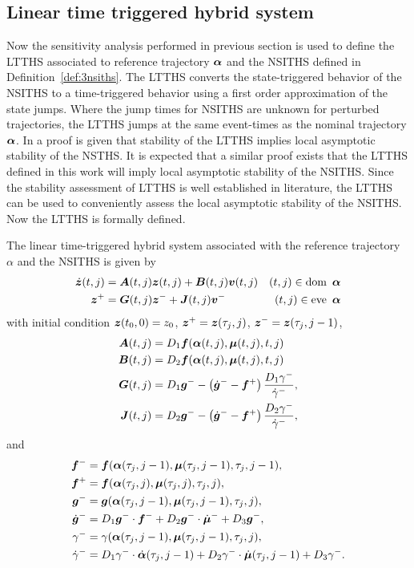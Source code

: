 \documentclass[../DC2017114Bouma.tex]{subfiles}
\begin{document}
\subsection{Linear time triggered hybrid system}
Now the sensitivity analysis performed in previous section is used to define the LTTHS associated to reference trajectory $\boldsymbol{\alpha}$ and the NSITHS defined in Definition~\ref{def:3nsiths}. The LTTHS converts the state-triggered behavior of the NSITHS to a time-triggered behavior using a first order approximation of the state jumps. Where the jump times for NSITHS are unknown for perturbed trajectories, the LTTHS jumps at the same event-times as the nominal trajectory $\boldsymbol{\alpha}$. In \cite{Rijnen2017} a proof is given that stability of the LTTHS implies local asymptotic stability of the NSTHS. It is expected that a similar proof exists that the LTTHS defined in this work will imply local asymptotic stability of the NSITHS. Since the stability assessment of LTTHS is well established in literature, the LTTHS can be used to conveniently assess the local asymptotic stability of the NSITHS. Now the LTTHS is formally defined.
\begin{mydef}[LTTHS]\label{def:3ltths}
The linear time-triggered hybrid system associated with the reference trajectory $\alpha$ and the NSITHS is given by
\begin{align}
\dot{{\boldsymbol{z}}}(t,j) &= {\boldsymbol{A}}(t,j){\boldsymbol{z}}(t,j) + {\boldsymbol{B}}(t,j){\boldsymbol{v}}(t,j) &(t,j)\in \operatorname{\textnormal{dom}}\ \boldsymbol{\alpha}\\
{\boldsymbol{z}}^+ &= {\boldsymbol{G}}(t,j){\boldsymbol{z}}^- + {\boldsymbol{J}}(t,j){\boldsymbol{v}}^- &(t,j)\in \operatorname{\textnormal{eve}}\ \boldsymbol{\alpha}
\end{align}
with initial condition ${\boldsymbol{z}}(t_0,0)=z_0$, ${\boldsymbol{z}}^+ = {\boldsymbol{z}}(\tau_j,j)$, ${\boldsymbol{z}}^- = {\boldsymbol{z}}(\tau_j,j-1)$,
\begin{align}
{\boldsymbol{A}}(t,j) &= D_1{\boldsymbol{f}}(\boldsymbol{\alpha}(t,j),\boldsymbol{\mu}(t,j),t,j)\\
{\boldsymbol{B}}(t,j) &= D_2{\boldsymbol{f}}(\boldsymbol{\alpha}(t,j),\boldsymbol{\mu}(t,j),t,j)\\
{\boldsymbol{G}}(t,j) & = D_1{\boldsymbol{g}}^- - \left(\dot{{\boldsymbol{g}}}^- - {\boldsymbol{f}}^+\right)\frac{D_1\gamma^-}{\dot{\gamma}^-},\\
{\boldsymbol{J}}(t,j) & = D_2{\boldsymbol{g}}^- - \left(\dot{{\boldsymbol{g}}}^- - {\boldsymbol{f}}^+\right)\frac{D_2\gamma^-}{\dot{\gamma}^-},
\end{align}
and
\begin{align}
{\boldsymbol{f}}^- &= {\boldsymbol{f}}(\boldsymbol{\alpha}(\tau_j,j-1),\boldsymbol{\mu}(\tau_j,j-1),\tau_j,j-1),\\
{\boldsymbol{f}}^+ &= {\boldsymbol{f}}(\boldsymbol{\alpha}(\tau_j,j),\boldsymbol{\mu}(\tau_j,j),\tau_j,j),\\
{\boldsymbol{g}}^- &= {\boldsymbol{g}}(\boldsymbol{\alpha}(\tau_j,j-1),\boldsymbol{\mu}(\tau_j,j-1),\tau_j,j),\\
\dot{{\boldsymbol{g}}}^- &= D_1{\boldsymbol{g}}^-\cdot {\boldsymbol{f}}^- + D_2{\boldsymbol{g}}^-\cdot \dot{\boldsymbol{\mu}}^- + D_3{\boldsymbol{g}}^-,\\
\gamma^- &= \gamma(\boldsymbol{\alpha}(\tau_j,j-1),\boldsymbol{\mu}(\tau_j,j-1),\tau_j,j),\\
\dot{\gamma}^- &= D_1\gamma^-\cdot\dot{\boldsymbol{\alpha}}(\tau_j,j-1) + D_2\gamma^-\cdot\dot{\boldsymbol{\mu}}(\tau_j,j-1) + D_3\gamma^-.
\end{align}
\end{mydef}
\end{document}
